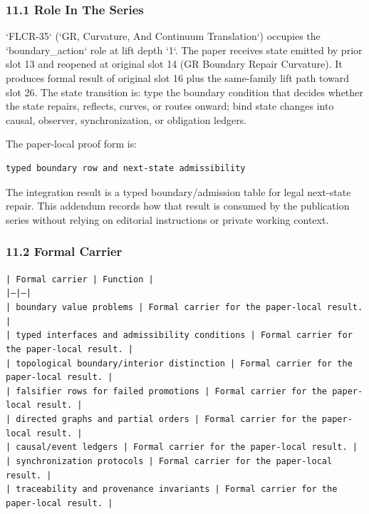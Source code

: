 \documentclass[11pt]{article}
\begin{document}
\subsubsection*{11.1 Role In The Series}

`FLCR-35` (`GR, Curvature, And Continuum Translation`) occupies the `boundary\_action` role at lift depth `1`.
The paper receives state emitted by prior slot 13 and reopened at original slot 14 (GR Boundary Repair Curvature). It produces formal result of original slot 16 plus the same-family lift path toward slot 26. The state transition is:
type the boundary condition that decides whether the state repairs, reflects, curves, or routes onward; bind state changes into causal, observer, synchronization, or obligation ledgers.

The paper-local proof form is:

\begin{verbatim}
typed boundary row and next-state admissibility
\end{verbatim}

The integration result is a typed boundary/admission table for legal next-state repair. This addendum records how that result is
consumed by the publication series without relying on editorial instructions or
private working context.

\subsubsection*{11.2 Formal Carrier}

\noindent\texttt{| Formal carrier | Function |}\\
\noindent\texttt{|---|---|}\\
\noindent\texttt{| boundary value problems | Formal carrier for the paper-local result. |}\\
\noindent\texttt{| typed interfaces and admissibility conditions | Formal carrier for the paper-local result. |}\\
\noindent\texttt{| topological boundary/interior distinction | Formal carrier for the paper-local result. |}\\
\noindent\texttt{| falsifier rows for failed promotions | Formal carrier for the paper-local result. |}\\
\noindent\texttt{| directed graphs and partial orders | Formal carrier for the paper-local result. |}\\
\noindent\texttt{| causal/event ledgers | Formal carrier for the paper-local result. |}\\
\noindent\texttt{| synchronization protocols | Formal carrier for the paper-local result. |}\\
\noindent\texttt{| traceability and provenance invariants | Formal carrier for the paper-local result. |}\\
\end{document}
